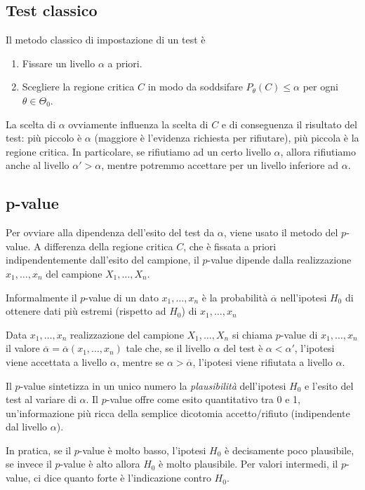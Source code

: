 \subsection{Test classico}
Il metodo classico di impostazione di un test è
\begin{enumerate}
	\item Fissare un livello $\alpha$ a priori.
	\item Scegliere la regione critica $C$ in modo da soddsifare $P_\theta(C) \leq \alpha$ per ogni
	      $\theta \in \Theta_0$.
\end{enumerate}
La scelta di $\alpha$ ovviamente influenza la scelta di $C$ e di conseguenza il risultato del test:
più piccolo è $\alpha$ (maggiore è l'evidenza richiesta per rifiutare), più piccola è la regione
critica. In particolare, se rifiutiamo ad un certo livello $\alpha$, allora rifiutiamo anche al
livello $\alpha' > \alpha$, mentre potremmo accettare per un livello inferiore ad $\alpha$.

\subsection{p-value}
Per ovviare alla dipendenza dell'esito del test da $\alpha$, viene usato il metodo del $p$-value.
A differenza della regione critica $C$, che è fissata a priori indipendentemente dall'esito del
campione, il $p$-value dipende dalla realizzazione $x_1, \dots, x_n$ del campione $X_1, \dots, X_n$.

Informalmente il $p$-value di un dato $x_1, \dots, x_n$ è la probabilità $\overline{\alpha}$
nell'ipotesi $H_0$ di ottenere dati più estremi (rispetto ad $H_0$) di $x_1, \dots, x_n$

\begin{definition}
	Data $x_1, \dots, x_n$ realizzazione del campione $X_1, \dots, X_n$ si chiama $p$-value di
	$x_1, \dots, x_n$ il valore $\overline{\alpha} = \overline{\alpha} (x_1, \dots, x_n)$ tale
	che, se il livello $\alpha$ del test è $\alpha < \alpha'$, l'ipotesi viene accettata a livello
	$\alpha$, mentre se $\alpha > \overline{\alpha}$, l'ipotesi viene rifiutata a livello $\alpha$.
\end{definition}

Il $p$-value sintetizza in un unico numero la \emph{plausibilità} dell'ipotesi $H_0$ e l'esito del
test al variare di $\alpha$. Il $p$-value offre come esito quantitativo tra 0 e 1, un'informazione
più ricca della semplice dicotomia accetto/rifiuto (indipendente dal livello $\alpha$).

In pratica, se il $p$-value è molto basso, l'ipotesi $H_0$ è decisamente poco plausibile, se invece
il $p$-value è alto allora $H_0$ è molto plausibile. Per valori intermedi, il $p$-value, ci dice
quanto forte è l'indicazione contro $H_0$.